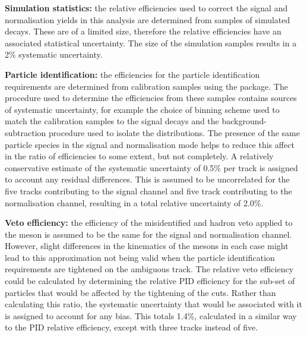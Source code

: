 \begin{description}
\item \textbf{Simulation statistics:} the relative efficiencies used to correct the signal and normalisation yields in this analysis are determined from samples of simulated decays. These are of a limited size, therefore the relative efficiencies have an associated statistical uncertainty. The size of the simulation samples results in a 2\% systematic uncertainty. 

\item \textbf{Particle identification:} the efficiencies for the particle identification requirements are determined from calibration samples using the \pidcalib package. The procedure used to determine the efficiencies from these samples contains sources of systematic uncertainty, for example the choice of binning scheme used to match the calibration samples to the signal decays and the background-subtraction procedure used to isolate the distributions. The presence of the same particle species in the signal and normalisation mode helps to reduce this affect in the ratio of efficiencies to some extent, but not completely. A relatively conservative estimate of the systematic uncertainty of 0.5\% per track is assigned to account any residual differences. This is assumed to be uncorrelated for the five tracks contributing to the signal channel and five track contributing to the normalisation channel, resulting in a total relative uncertainty of 2.0\%.

\item \textbf{Veto efficiency:} the efficiency of the misidentified \D and \Lc hadron veto applied to the \Dsp meson is assumed to be the same for the signal and normalisation channel. However, slight differences in the kinematics of the \Dsp mesons in each case might lead to this approximation not being valid when the particle identification requirements are tightened on the ambiguous track. The relative veto efficiency could be calculated by determining the relative PID efficiency for the sub-set of particles that would be affected by the tightening of the cuts. Rather than calculating this ratio, the systematic uncertainty that would be associated with it is assigned to account for any bias. This totals 1.4\%, calculated in a similar way to the PID relative efficiency, except with three tracks instead of five.   


\end{description}
